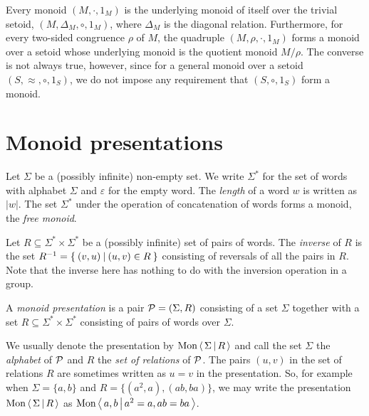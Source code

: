 Every monoid $(M, \cdot, 1_M)$ is the underlying monoid of itself over the trivial setoid,
$(M, \Delta_M, \circ, 1_M)$, where $\Delta_M$ is the diagonal relation.
Furthermore, for every two-sided congruence $\rho$ of $M$, the quadruple
$(M, \rho, \cdot, 1_M)$ forms a monoid over a setoid whose underlying monoid is
the quotient monoid $M/\rho$. The converse is not always true, however, since for a general monoid over a setoid
$(S, \approx, \circ, 1_S)$, we do not impose any requirement that $(S, \circ, 1_S)$ form a monoid.


\section{Monoid presentations}

Let $\Sigma$ be a (possibly infinite) non-empty set. We write $\Sigma^\ast$ for the set of words with alphabet $\Sigma$
and $\varepsilon$ for the empty word. The \emph{length} of a word $w$ is written as $|w|$. The set $\Sigma^\ast$ under
the operation of concatenation of words forms a monoid, the \emph{free monoid}.

Let $R\subseteq \Sigma^\ast \times \Sigma^\ast$ be a (possibly infinite) set of pairs of words. The \emph{inverse} of
$R$ is the set $R^{-1} = \left\{\: (v, u) \: \middle|\: (u, v)\in R \:\right\}$ consisting of reversals of all the pairs in $R$. Note that the
inverse here has nothing to do with the inversion operation in a group.

\begin{definition}%
\label{def:presentation}
\rocqok{}
A \emph{monoid presentation} is a pair $\mathcal{P} = (\Sigma, R)$ consisting of a set $\Sigma$ together with a set
$R\subseteq \Sigma^\ast \times \Sigma^\ast$ consisting of pairs of words over $\Sigma$.
\end{definition}
We usually denote the
presentation by $\textrm{Mon}\left\langle\, \Sigma \,\middle|\, R \,\right\rangle$ and call the set $\Sigma$ the \emph{alphabet} of $\mathcal{P}$ and $R$ the
\emph{set of relations} of $\mathcal{P}$. The pairs $(u, v)$ in the set of relations $R$ are sometimes written as $u=v$ in the
presentation. So, for example when $\Sigma = \{a, b\}$ and $R = \{(a^2, a), (ab, ba)\}$, we may write the presentation
$\textrm{Mon}\left\langle\, \Sigma \,\middle|\, R \,\right\rangle$ as $\textrm{Mon}\left\langle\, a, b \,\middle|\,  a^2 = a, ab=ba \,\right\rangle$.

